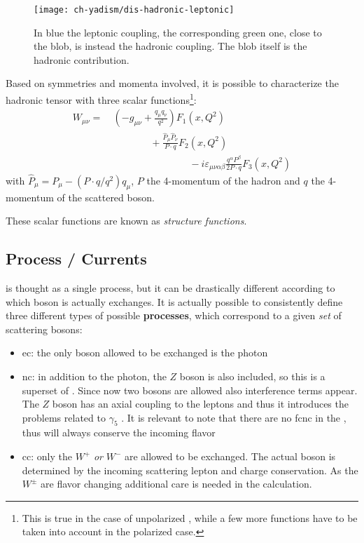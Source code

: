 \begin{figure}
	\centering
	\texttt{[image: ch-yadism/dis-hadronic-leptonic]}
	\caption{
    In blue the leptonic coupling, the corresponding green one, close to the
    blob, is instead the hadronic coupling. The blob itself is the hadronic
    contribution.
  }
	\label{fig:dis/dis-lept-hadr}
\end{figure}

Based on symmetries and momenta involved, it is possible to characterize the
hadronic tensor with three scalar functions\footnote{
  This is true in the case of unpolarized \dis, while a few more functions have
  to be taken into account in the polarized case.
}:
\begin{align}
  W_{\mu\nu} =&~ \left(-g_{\mu\nu} + \frac{q_\mu q_\nu}{q^2}\right) F_1(x,Q^2)\nonumber\\
          &\qquad\qquad + \frac{\hat P_\mu \hat P_\nu}{P \cdot q} F_2(x,Q^2)\nonumber\\
          &\qquad\qquad\qquad\qquad - i \varepsilon_{\mu\nu\alpha\beta}
          \frac{q^\alpha P^\beta}{2 P\cdot q} F_3(x,Q^2)
  \label{eq:dis/hadr-tens}
\end{align}
with $\hat P_\mu = P_\mu - (P\cdot q / q^2) q_\mu$, $P$ the 4-momentum of the
hadron and $q$ the 4-momentum of the scattered boson.

These scalar functions are known as \dis \textit{structure functions}.

\subsection{Process / Currents}

\dis is thought as a single process, but it can be drastically different
according to which \ew boson is actually exchanges.
It is actually possible to consistently define three different types of
possible \textbf{processes}, which correspond to a given \textit{set} of
scattering bosons:

\begin{itemize}
  \item \acrfull{ec}: the only boson allowed to be exchanged is the photon
  \item \acrfull{nc}: in addition to the photon, the $Z$ boson is also
    included, so this is a superset of \ec.
    Since now two bosons are allowed also interference terms appear.
    The $Z$ boson has an axial coupling to the leptons and thus it introduces
    the problems related to $\gamma_5$ \cite{Gnendiger:2017pys}.
    It is relevant to note that there are no \acrfull{fcnc} in the \sm, thus
    \nc will always conserve the incoming flavor
  \item \acrfull{cc}: only the $W^+$ \textit{or} $W^-$ are allowed to be
    exchanged.
    The actual boson is determined by the incoming scattering lepton and charge
    conservation. As the $W^\pm$ are flavor changing additional care is needed
    in the calculation.
\end{itemize}


